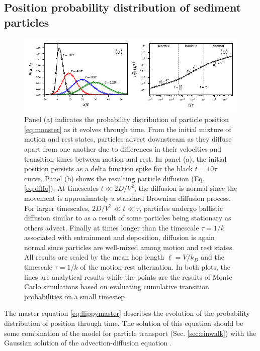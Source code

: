 \subsection{Position probability distribution of sediment particles}
\begin{figure}
	\centerline{\includegraphics{figures/ch2/figure2_slopeKey.pdf}}
	\caption{Panel (a) indicates the probability distribution of particle position \ref{eq:monster} as it evolves through time. From the initial mixture of motion and rest states, particles advect downstream as they diffuse apart from one another due to differences in their velocities and transition times between motion and rest. In panel (a), the initial position persists as a delta function spike for the black $t=10\tau$ curve. Panel (b) shows the resulting particle diffusion (Eq. \ref{eq:diffo}). At timescales $t \ll 2D/V^2$, the diffusion is normal since the movement is approximately a standard Brownian diffusion process. For larger timescales, $2D/V^2 \ll t \ll \tau$, particles undergo ballistic diffusion similar to \citet{Lisle1998} as a result of some particles being stationary as others advect. Finally at times longer than the timescale $\tau = 1/k$ associated with entrainment and deposition, diffusion is again normal since particles are well-mixed among motion and rest states. All results are scaled by the mean hop length $\ell=V/k_D$ and the timescale $\tau=1/k$ of the motion-rest alternation. In both plots, the lines are analytical results while the points are the results of Monte Carlo simulations based on evaluating cumulative transition probabilities on a small timestep \citep[e.g.][]{Barik2006}.}
	\label{fig:flippyfig1}
\end{figure}
The master equation \ref{eq:flippymaster} describes the evolution of the probability distribution of position through time. The solution of this equation should be some combination of the \citet{Einstein1937} model for particle transport (Sec. \ref{sec:einwalk}) with the Gaussian solution of the advection-diffusion equation \citep[e.g.][]{Morse1953}.

